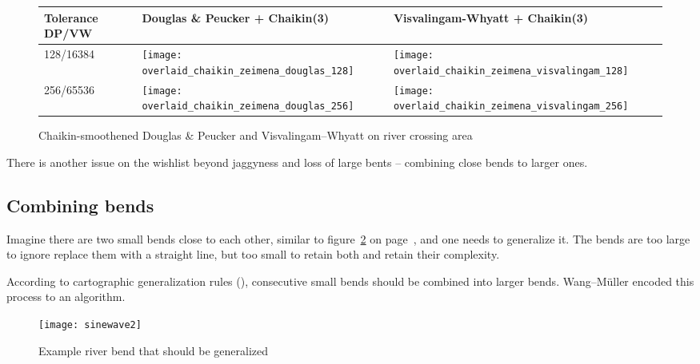 \documentclass[a4paper]{article}
\newcommand{\DP}{Douglas \& Peucker}
\newcommand{\VW}{Visvalingam--Whyatt}
\newcommand{\WM}{Wang--M{\"u}ller}
\begin{document}
\begin{figure}[h]
    \renewcommand{\tabularxcolumn}[1]{>{\center\small}m{#1}}
    \begin{tabularx}{\textwidth}{ p{2.1cm} | X | X | }
        Tolerance DP/VW                                                              &
        Douglas \& Peucker + Chaikin(3)                                              &
        Visvalingam-Whyatt + Chaikin(3)                                              \tabularnewline \hline

        128/16384                                                                    &
        \texttt{[image: overlaid\_chaikin\_zeimena\_douglas\_128]}     &
        \texttt{[image: overlaid\_chaikin\_zeimena\_visvalingam\_128]} \tabularnewline \hline

        256/65536                                                                    &
        \texttt{[image: overlaid\_chaikin\_zeimena\_douglas\_256]}     &
        \texttt{[image: overlaid\_chaikin\_zeimena\_visvalingam\_256]} \tabularnewline \hline

    \end{tabularx}
    \caption{Chaikin-smoothened {\DP} and {\VW} on river crossing area}
    \label{tab:chaikin-crossing}
\end{figure}

There is another issue on the wishlist beyond jaggyness and loss of large bents
-- combining close bends to larger ones.

\subsection{Combining bends}

Imagine there are two small bends close to each other, similar to
figure~\ref{fig:sinewave2} on page~\pageref{fig:sinewave2}, and one needs to
generalize it. The bends are too large to ignore replace them with a straight
line, but too small to retain both and retain their complexity.

According to cartographic generalization rules
(\cite{miuller1995generalization}), consecutive small bends should be combined
into larger bends. {\WM} encoded this process to an algorithm.

\begin{figure}[h]
    \centering
    \texttt{[image: sinewave2]}
    \caption{Example river bend that should be generalized}
    \label{fig:sinewave2}
\end{figure}
\end{document}
